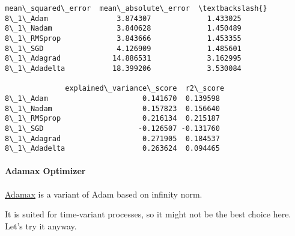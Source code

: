 \documentclass[11pt]{article}
\makeatletter
\newcommand{\boxspacing}{\kern\kvtcb@left@rule\kern\kvtcb@boxsep}
\newcommand{\prompt}[4]{
        {\ttfamily\llap{{\color{#2}[#3]:\hspace{3pt}#4}}\vspace{-\baselineskip}}
    }
\makeatother
\begin{document}
            \begin{tcolorbox}[breakable, size=fbox, boxrule=.5pt, pad at break*=1mm, opacityfill=0]
\prompt{Out}{outcolor}{68}{\boxspacing}
\begin{Verbatim}[commandchars=\\\{\}]
              mean\_squared\_error  mean\_absolute\_error  \textbackslash{}
8\_1\_Adam                3.874307             1.433025
8\_1\_Nadam               3.840628             1.450489
8\_1\_RMSprop             3.843666             1.453355
8\_1\_SGD                 4.126909             1.485601
8\_1\_Adagrad            14.886531             3.162995
8\_1\_Adadelta           18.399206             3.530084

              explained\_variance\_score  r2\_score
8\_1\_Adam                      0.141670  0.139598
8\_1\_Nadam                     0.157823  0.156640
8\_1\_RMSprop                   0.216134  0.215187
8\_1\_SGD                      -0.126507 -0.131760
8\_1\_Adagrad                   0.271905  0.184537
8\_1\_Adadelta                  0.263624  0.094465
\end{Verbatim}
\end{tcolorbox}
        
    \paragraph{Adamax Optimizer}\label{adamax-optimizer}

\href{https://keras.io/api/optimizers/adamax/}{Adamax} is a variant of
Adam based on infinity norm.

It is suited for time-variant processes, so it might not be the best
choice here. Let's try it anyway.
\end{document}
